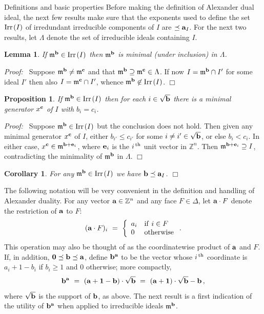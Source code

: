 \documentclass[12pt,leqno]{article}
\newtheorem{lemma}[thm]{Lemma}
\newtheorem{cor}[thm]{Corollary}
\newtheorem{prop}[thm]{Proposition}
\def\Irr{{\rm Irr}{\scriptscriptstyle \,}}
\def\aa{{{\rm \bf a}}}
\def\bb{{{\rm \bf b}}}
\def\cc{{{\rm \bf c}}}
\def\ee{{{\rm \bf e}}}
\def\mm{{\mathfrak m}}
\def\ZZ{{\mathbb Z}}
\begin{document}
\begin{section}{Definitions and basic properties}
Before making the definition of Alexander dual ideal, the next few
results make sure that the exponents used to define the set $\Irr(I)$ of
irredundant irreducible components of $I$ are $\preceq \aa_I$.  For the
next two results, let $\Lambda$ denote the set of irreducible ideals
containing $I$.

\begin{lemma}
If $\mm^\bb \in \Irr(I)$ then $\mm^\bb$ is minimal (under inclusion) in
$\Lambda$.
\end{lemma}
{\it Proof:\ } Suppose $\mm^\bb \neq \mm^\cc$ and that $\mm^\bb \supseteq
\mm^\cc \in \Lambda$.  If now $I = \mm^\bb \cap I'$ for some ideal $I'$
then also $I = \mm^\cc \cap I'$, whence $\mm^\bb \not\in \Irr(I)$.
%
\hfill
$\Box$
\begin{prop}
If $\mm^\bb \in \Irr(I)$ then for each $i \in \sqrt\bb$ there is a
minimal generator $x^\cc$ of $I$ with $b_i = c_i$.
\end{prop}
{\it Proof:\ } Suppose $\mm^\bb \in \Irr(I)$ but the conclusion does not
hold.  Then given any minimal generator $x^\cc$ of $I$, either $b_{i'}
\leq c_{i'}$ for some $i \neq i' \in \sqrt\bb$, or else $b_i < c_i$.  In
either case, $x^\cc \in \mm^{\bb + \ee_i}$, where $\ee_i$ is the
$i^{\,\rm th}$ unit vector in $\ZZ^n$.  Then $\mm^{\bb + \ee_i} \supseteq
I$, contradicting the minimality of $\mm^\bb$ in $\Lambda$.
%
\hfill
$\Box$
\begin{cor} \label{cor:Irr}
For any $\mm^\bb \in \Irr(I)$ we have $\bb \preceq \aa_I$. \hfill $\Box$
\end{cor}

The following notation will be very convenient in the definition and
handling of Alexander duality.  For any vector $\aa \in \ZZ^n$ and any
face $F \in \Delta$, let $\aa \cdot F$ denote the restriction of $\aa$ to
$F$:
$$
  (\aa \cdot F)_i\ =\ \left\{\begin{array}{ll}
				a_i & {\rm if}\ i \in F \cr
				0     & {\rm otherwise}
			\end{array}\right..
$$
This operation may also be thought of as the coordinatewise product of
$\aa$ and $F$.  If, in addition, ${\bf 0} \preceq \bb \preceq \aa$,
define $\bb^\aa$ to be the vector whose $i^{\,\rm th}$ coordinate is $a_i
+ 1 - b_i$ if $b_i \geq 1$ and $0$ otherwise; more compactly,
$$
  \bb^\aa\ =\ (\aa + {\bf 1} - \bb) \cdot \sqrt\bb
	 \ =\ (\aa + {\bf 1}) \cdot \sqrt\bb - \bb\,,
$$
where $\sqrt\bb$ is the support of $\bb$, as above.  The next result is a
first indication of the utility of $\bb^\aa$ when applied to irreducible
ideals $\mm^\bb$.


\end{section}
\end{document}

